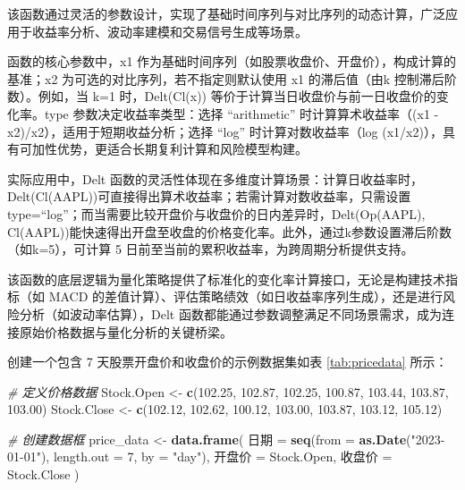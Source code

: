 \documentclass[]{ctexbook}
\newenvironment{Shaded}{\begin{snugshade}}{\end{snugshade}}
\newcommand{\AttributeTok}[1]{\textcolor[rgb]{0.13,0.29,0.53}{#1}}
\newcommand{\CommentTok}[1]{\textcolor[rgb]{0.56,0.35,0.01}{\textit{#1}}}
\newcommand{\DecValTok}[1]{\textcolor[rgb]{0.00,0.00,0.81}{#1}}
\newcommand{\FloatTok}[1]{\textcolor[rgb]{0.00,0.00,0.81}{#1}}
\newcommand{\FunctionTok}[1]{\textcolor[rgb]{0.13,0.29,0.53}{\textbf{#1}}}
\newcommand{\NormalTok}[1]{#1}
\newcommand{\OtherTok}[1]{\textcolor[rgb]{0.56,0.35,0.01}{#1}}
\newcommand{\StringTok}[1]{\textcolor[rgb]{0.31,0.60,0.02}{#1}}
\begin{document}
该函数通过灵活的参数设计，实现了基础时间序列与对比序列的动态计算，广泛应用于收益率分析、波动率建模和交易信号生成等场景。

函数的核心参数中，x1 作为基础时间序列（如股票收盘价、开盘价），构成计算的基准；x2 为可选的对比序列，若不指定则默认使用 x1 的滞后值（由k 控制滞后阶数）。例如，当 k=1 时，Delt(Cl(x)) 等价于计算当日收盘价与前一日收盘价的变化率。type 参数决定收益率类型：选择 ``arithmetic'' 时计算算术收益率（(x1 - x2)/x2），适用于短期收益分析；选择 ``log'' 时计算对数收益率（log (x1/x2)），具有可加性优势，更适合长期复利计算和风险模型构建。

实际应用中，Delt 函数的灵活性体现在多维度计算场景：计算日收益率时，Delt(Cl(AAPL))可直接得出算术收益率；若需计算对数收益率，只需设置type=``log''；而当需要比较开盘价与收盘价的日内差异时，Delt(Op(AAPL), Cl(AAPL))能快速得出开盘至收盘的价格变化率。此外，通过k参数设置滞后阶数（如k=5），可计算 5 日前至当前的累积收益率，为跨周期分析提供支持。

该函数的底层逻辑为量化策略提供了标准化的变化率计算接口，无论是构建技术指标（如 MACD 的差值计算）、评估策略绩效（如日收益率序列生成），还是进行风险分析（如波动率估算），Delt 函数都能通过参数调整满足不同场景需求，成为连接原始价格数据与量化分析的关键桥梁。

创建一个包含 7 天股票开盘价和收盘价的示例数据集如表 \ref{tab:pricedata} 所示：

\begin{Shaded}
\begin{Highlighting}[]
\CommentTok{\# 定义价格数据}
\NormalTok{Stock.Open }\OtherTok{\textless{}{-}} \FunctionTok{c}\NormalTok{(}\FloatTok{102.25}\NormalTok{, }\FloatTok{102.87}\NormalTok{, }\FloatTok{102.25}\NormalTok{, }\FloatTok{100.87}\NormalTok{, }\FloatTok{103.44}\NormalTok{, }\FloatTok{103.87}\NormalTok{, }\FloatTok{103.00}\NormalTok{)}
\NormalTok{Stock.Close }\OtherTok{\textless{}{-}} \FunctionTok{c}\NormalTok{(}\FloatTok{102.12}\NormalTok{, }\FloatTok{102.62}\NormalTok{, }\FloatTok{100.12}\NormalTok{, }\FloatTok{103.00}\NormalTok{, }\FloatTok{103.87}\NormalTok{, }\FloatTok{103.12}\NormalTok{, }\FloatTok{105.12}\NormalTok{)}

\CommentTok{\# 创建数据框}
\NormalTok{price\_data }\OtherTok{\textless{}{-}} \FunctionTok{data.frame}\NormalTok{(}
\NormalTok{  日期 }\OtherTok{=} \FunctionTok{seq}\NormalTok{(}\AttributeTok{from =} \FunctionTok{as.Date}\NormalTok{(}\StringTok{"2023{-}01{-}01"}\NormalTok{), }\AttributeTok{length.out =} \DecValTok{7}\NormalTok{, }\AttributeTok{by =} \StringTok{"day"}\NormalTok{),}
\NormalTok{  开盘价 }\OtherTok{=}\NormalTok{ Stock.Open,}
\NormalTok{  收盘价 }\OtherTok{=}\NormalTok{ Stock.Close}
\NormalTok{)}
\end{Highlighting}
\end{Shaded}
\end{document}
